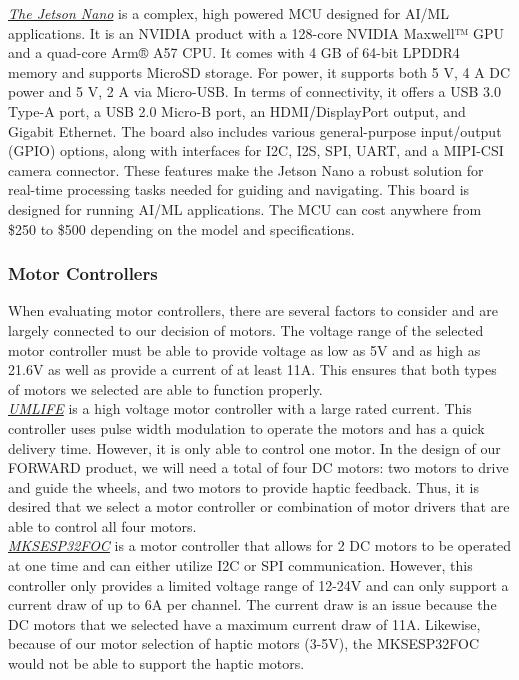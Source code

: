 \noindent \underline{\textit{The Jetson Nano}} is a complex, high powered MCU designed for AI/ML applications. It is an NVIDIA product with a 128-core NVIDIA Maxwell™ GPU and a quad-core Arm® A57 CPU. It comes with 4 GB of 64-bit LPDDR4 memory and supports MicroSD storage. For power, it supports both 5 V, 4 A DC power and 5 V, 2 A via Micro-USB. In terms of connectivity, it offers a USB 3.0 Type-A port, a USB 2.0 Micro-B port, an HDMI/DisplayPort output, and Gigabit Ethernet. The board also includes various general-purpose input/output (GPIO) options, along with interfaces for I2C, I2S, SPI, UART, and a MIPI-CSI camera connector. These features make the Jetson Nano a robust solution for real-time processing tasks needed for guiding and navigating. This board is designed for running AI/ML applications. The MCU can cost anywhere from \$250 to \$500 depending on the model and specifications.\\

\subsubsection{Motor Controllers}
\noindent When evaluating motor controllers, there are several factors to consider and are largely connected to our decision of motors. The voltage range of the selected motor controller must be able to provide voltage as low as 5V and as high as 21.6V as well as provide a current of at least 11A. This ensures that both types of motors we selected are able to function properly.\\

\noindent \underline{\textit{UMLIFE}} is a high voltage motor controller with a large rated current. This controller uses pulse width modulation to operate the motors and has a quick delivery time. However, it is only able to control one motor. In the design of our FORWARD product, we will need a total of four DC motors: two motors to drive and guide the wheels, and two motors to provide haptic feedback. Thus, it is desired that we select a motor controller or combination of motor drivers that are able to control all four motors.\\

\noindent \underline{\textit{MKSESP32FOC}} is a motor controller that allows for 2 DC motors to be operated at one time and can either utilize I2C or SPI communication. However, this controller only provides a limited voltage range of 12-24V and can only support a current draw of up to 6A per channel. The current draw is an issue because the DC motors that we selected have a maximum current draw of 11A. Likewise, because of our motor selection of haptic motors (3-5V), the MKSESP32FOC would not be able to support the haptic motors.\\

